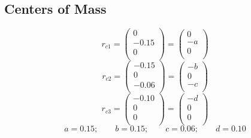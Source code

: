 \documentclass{article}
\begin{document}
\subsection{Centers of Mass}
\[r_{c1}=\begin{pmatrix}
0\\
-0.15\\
0\\
\end{pmatrix} = \begin{pmatrix}
0\\
-a\\
0\\
\end{pmatrix}
\]
\[r_{c2}=\begin{pmatrix}
-0.15\\
0\\
-0.06\\
\end{pmatrix} = \begin{pmatrix}
-b\\
0\\
-c\\
\end{pmatrix}
\]
\[r_{c3}=\begin{pmatrix}
-0.10\\
0\\
0\\
\end{pmatrix}=\begin{pmatrix}
-d\\
0\\
0\\
\end{pmatrix}
\]
\[a=0.15;\qquad b=0.15;\qquad c=0.06;\qquad d=0.10 
\]
\end{document}
